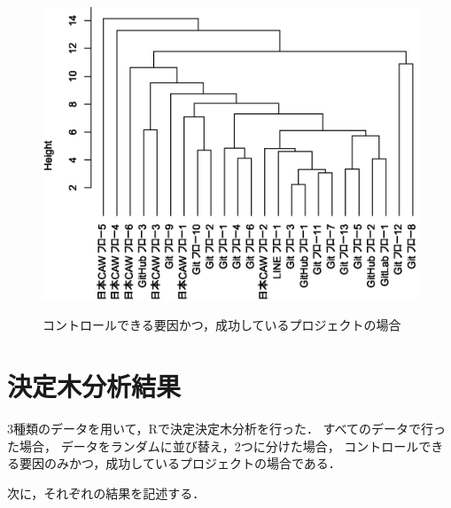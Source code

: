 \begin{figure}[H]
\centering　
\includegraphics[width=13cm]{onlyCluster.eps}
\caption{コントロールできる要因かつ，成功しているプロジェクトの場合}\label{onlyCluster}
\end{figure}










\section{決定木分析結果}
3種類のデータを用いて，Rで決定決定木分析を行った．
すべてのデータで行った場合，
データをランダムに並び替え，2つに分けた場合，
コントロールできる要因のみかつ，成功しているプロジェクトの場合である．

次に，それぞれの結果を記述する．
